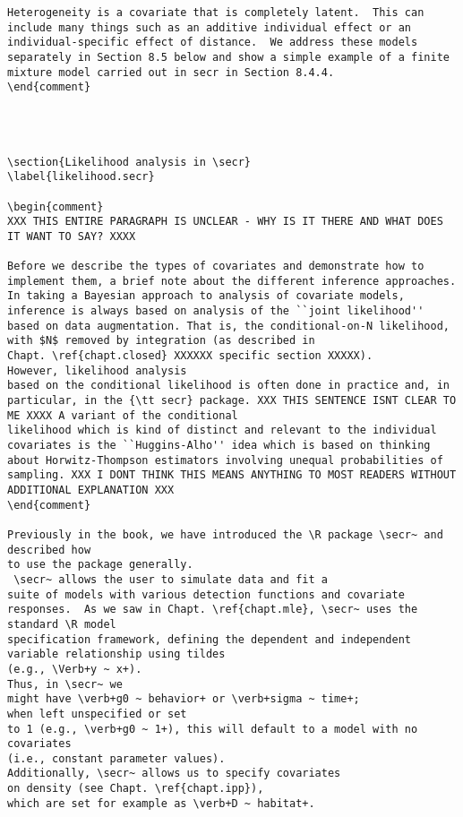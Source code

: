 {\begin{verbatim}
Heterogeneity is a covariate that is completely latent.  This can
include many things such as an additive individual effect or an
individual-specific effect of distance.  We address these models
separately in Section 8.5 below and show a simple example of a finite
mixture model carried out in secr in Section 8.4.4.
\end{comment}




\section{Likelihood analysis in \secr}
\label{likelihood.secr}

\begin{comment}
XXX THIS ENTIRE PARAGRAPH IS UNCLEAR - WHY IS IT THERE AND WHAT DOES IT WANT TO SAY? XXXX

Before we describe the types of covariates and demonstrate how to
implement them, a brief note about the different inference approaches.
In taking a Bayesian approach to analysis of covariate models,
inference is always based on analysis of the ``joint likelihood''
based on data augmentation. That is, the conditional-on-N likelihood,
with $N$ removed by integration (as described in
Chapt. \ref{chapt.closed} XXXXXX specific section XXXXX).
However, likelihood analysis
based on the conditional likelihood is often done in practice and, in
particular, in the {\tt secr} package. XXX THIS SENTENCE ISNT CLEAR TO ME XXXX A variant of the conditional
likelihood which is kind of distinct and relevant to the individual
covariates is the ``Huggins-Alho'' idea which is based on thinking
about Horwitz-Thompson estimators involving unequal probabilities of
sampling. XXX I DONT THINK THIS MEANS ANYTHING TO MOST READERS WITHOUT ADDITIONAL EXPLANATION XXX 
\end{comment}

Previously in the book, we have introduced the \R package \secr~ and described how
to use the package generally. 
 \secr~ allows the user to simulate data and fit a
suite of models with various detection functions and covariate
responses.  As we saw in Chapt. \ref{chapt.mle}, \secr~ uses the standard \R model
specification framework, defining the dependent and independent
variable relationship using tildes
(e.g., \Verb+y ~ x+).
Thus, in \secr~ we
might have \verb+g0 ~ behavior+ or \verb+sigma ~ time+;
when left unspecified or set
to 1 (e.g., \verb+g0 ~ 1+), this will default to a model with no
covariates
(i.e., constant parameter values).
Additionally, \secr~ allows us to specify covariates 
on density (see Chapt. \ref{chapt.ipp}),
which are set for example as \verb+D ~ habitat+.


\end{verbatim}}
